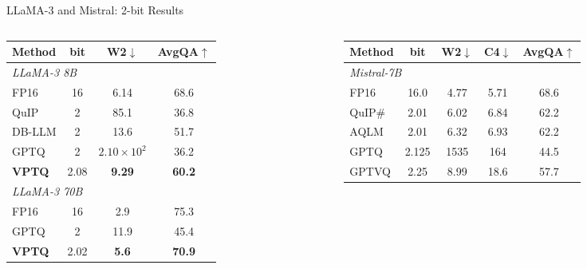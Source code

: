 \begin{frame}{LLaMA-3 and Mistral: 2-bit Results}
  \begin{columns}[T]
    \begin{column}{0.52\textwidth}
      \scriptsize
      \begin{tabular}{lccc}
        \toprule
        Method & bit & W2$\downarrow$ & AvgQA$\uparrow$ \\
        \midrule
        \multicolumn{4}{l}{\textit{LLaMA-3 8B}} \\
        FP16          & 16   & 6.14              & 68.6          \\
        QuIP          & 2    & 85.1              & 36.8          \\
        DB-LLM        & 2    & 13.6              & 51.7          \\
        GPTQ          & 2    & $2.10\!\times\!10^{2}$ & 36.2     \\
        \rowcolor{mycolor!15}
        \textbf{VPTQ} & 2.08 & \textbf{9.29}     & \textbf{60.2} \\
        \midrule
        \multicolumn{4}{l}{\textit{LLaMA-3 70B}} \\
        FP16          & 16   & 2.9               & 75.3          \\
        GPTQ          & 2    & 11.9              & 45.4          \\
        \rowcolor{mycolor!15}
        \textbf{VPTQ} & 2.02 & \textbf{5.6}      & \textbf{70.9} \\
        \bottomrule
      \end{tabular}
    \end{column}
    \begin{column}{0.48\textwidth}
      \scriptsize
      \begin{tabular}{lcccc}
        \toprule
        Method & bit & W2$\downarrow$ & C4$\downarrow$ & AvgQA$\uparrow$ \\
        \midrule
        \multicolumn{5}{l}{\textit{Mistral-7B}} \\
        FP16          & 16.0  & 4.77          & 5.71          & 68.6          \\
        QuIP\#        & 2.01  & 6.02          & 6.84          & 62.2          \\
        AQLM          & 2.01  & 6.32          & 6.93          & 62.2          \\
        GPTQ          & 2.125 & 1535          & 164           & 44.5          \\
        GPTVQ         & 2.25  & 8.99          & 18.6          & 57.7          \\

\end{tabular}
\end{column}
\end{columns}
\end{frame}
